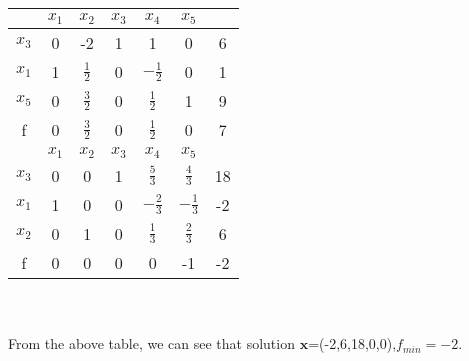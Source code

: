 \documentclass[paper=a4, fontsize=11pt]{scrartcl} %
\numberwithin{equation}{section} %
\numberwithin{figure}{section} %
\numberwithin{table}{section} %
\begin{document}
\begin{enumerate}
\begin{tabular}{|c|c|c|c|c|c|c|}
\hline &$x_1$&$x_2$&$x_3$&$x_4$&$x_5$&\\
\hline $x_3$&0 &-2& 1& 1& 0&6\\
$x_1$&1&$\frac{1}{2}$&0&$-\frac{1}{2}$&0&1\\
$x_5$&0&\Large{\textcircled{\small{$\frac{3}{2}$}}}&0&$\frac{1}{2}$ & 1&9\\
\hline f    &0 & $\frac{3}{2}$&0& $\frac{1}{2}$& 0&7\\
\hline
\hline &$x_1$&$x_2$&$x_3$&$x_4$&$x_5$&\\
\hline $x_3$&0 & 0& 1& $\frac{5}{3}$&$\frac{4}{3}$&18\\
$x_1$&1&0&0&$-\frac{2}{3}$&$-\frac{1}{3}$&-2\\
$x_2$&0&1&0&$\frac{1}{3}$&$\frac{2}{3}$&6\\
\hline f    &0 & 0&0& 0& -1&-2\\
\hline
\end{tabular}
\\\\
From the above table, we can see that solution $\mathbf{x}$=(-2,6,18,0,0),$f_{min}=-2$.

\end{enumerate}
\end{document}

